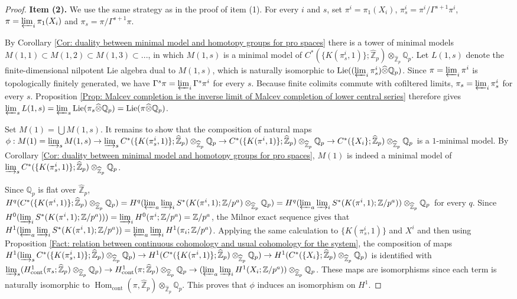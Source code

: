 \documentclass[11pt]{amsart}
\theoremstyle{definition}
\numberwithin{equation}{section}
\numberwithin{equation}{section}
\newcommand\QQ{\mathbb{Q}}
\newcommand\ZZ{\mathbb{Z}}
\DeclareMathOperator{\homo}{Hom}
\DeclareMathOperator{\Lie}{Lie}
\DeclareMathOperator{\cont}{cont}
\begin{document}
\begin{proof}
\textbf{Item (2). } We use the same strategy as in the proof of item (1). For every $i$ and $s$, set $\pi^i=\pi_1(X_i)$, $\pi^i_s=\pi^i/\Gamma^{s+1}\pi^i$, $\pi=\varprojlim_i \pi_1(X_i)$ and $\pi_s=\pi/\Gamma^{s+1}\pi$.


By Corollary \ref{Cor: duality between minimal model and homotopy groups for pro spaces} there is a tower of minimal models $M(1,1)\subset M(1,2)\subset M(1,3)\subset ...$, in which $M(1,s)$ is a minimal model of $C^*(\{K(\pi^i_s,1)\};\widehat{\ZZ}_p)\otimes_{\widehat{\ZZ}_p} \QQ_p$. Let $L(1,s)$ denote the finite-dimensional nilpotent Lie algebra dual to $M(1,s)$, which is naturally isomorphic to $\Lie((\varprojlim_i \pi^i_s)\widehat{\otimes}\QQ_p)$. Since $\pi=\varprojlim_i \pi^i$ is topologically finitely generated, we have $\Gamma^s\pi=\varprojlim_i \Gamma^s\pi^i$ for every $s$. Because finite colimits commute with cofiltered limits, $\pi_s=\varprojlim_i \pi^i_s$ for every $s$. Proposition \ref{Prop: Malcev completion is the inverse limit of Malcev completion of lower central series} therefore gives $\varprojlim_sL(1,s)=\varprojlim_s\Lie(\pi_{s}\widehat{\otimes}\QQ_p)=\Lie(\pi\widehat{\otimes}\QQ_p)$.

Set $M(1)=\bigcup M(1,s)$. It remains to show that the composition of natural maps $\phi:M(1)= \varinjlim_sM(1,s)\rightarrow \varinjlim_sC^*(\{K(\pi^i_s,1)\};\widehat{\ZZ}_p)\otimes_{\widehat{\ZZ}_p} \QQ_p\rightarrow C^*(\{K(\pi^i,1)\};\widehat{\ZZ}_p)\otimes_{\widehat{\ZZ}_p} \QQ_p\rightarrow C^*(\{X_i\};\widehat{\ZZ}_p)\otimes_{\widehat{\ZZ}_p} \QQ_p$ is a $1$-minimal model. 
By Corollary \ref{Cor: duality between minimal model and homotopy groups for pro spaces}, $M(1)$ is indeed a minimal model of $\varinjlim_sC^*(\{K(\pi^i_s,1)\};\widehat{\ZZ}_p)\otimes_{\widehat{\ZZ}_p} \QQ_p$.

Since $\QQ_p$ is flat over $\widehat{\ZZ}_p$, $H^q(C^*(\{K(\pi^i,1)\};\widehat{\ZZ}_p)\otimes_{\widehat{\ZZ}_p} \QQ_p)=H^q(\varprojlim_a \varinjlim_i S^*(K(\pi^i,1);\ZZ/p^a)\otimes_{\widehat{\ZZ}_p}\QQ_p)=H^q(\varprojlim_a \varinjlim_i S^*(K(\pi^i,1);\ZZ/p^a))\otimes_{\widehat{\ZZ}_p}\QQ_p$ for every $q$. Since $H^0(\varinjlim_i S^*(K(\pi^i,1);\ZZ/p^a)))=\varinjlim_i H^0(\pi^i;\ZZ/p^a)=\ZZ/p^a$, the Milnor exact sequence gives that $H^1(\varprojlim_a \varinjlim_i S^*(K(\pi^i,1);\ZZ/p^a))=\varprojlim_a \varinjlim_i H^1(\pi_i;\ZZ/p^a)$. Applying the same calculation to $\{K(\pi^i_s,1)\}$ and $X^i$ and then using Proposition \ref{Fact: relation between continuous cohomology and usual cohomology for the system}, the composition of maps $H^1(\varinjlim_sC^*(\{K(\pi^i_s,1)\};\widehat{\ZZ}_p)\otimes_{\widehat{\ZZ}_p} \QQ_p)\rightarrow H^1(C^*(\{K(\pi^i,1)\};\widehat{\ZZ}_p)\otimes_{\widehat{\ZZ}_p} \QQ_p)\rightarrow H^1(C^*(\{X_i\};\widehat{\ZZ}_p)\otimes_{\widehat{\ZZ}_p} \QQ_p)$ is identified with $\varinjlim_s (H^1_{\cont}(\pi_s;\widehat{\ZZ}_p)\otimes_{\widehat{\ZZ}_p}\QQ_p)\rightarrow H^1_{\cont}(\pi;\widehat{\ZZ}_p)\otimes_{\widehat{\ZZ}_p}\QQ_p\rightarrow (\varprojlim_a\varinjlim_i H^1(X_i;\ZZ/p^a))\otimes_{\widehat{\ZZ}_p}\QQ_p$. These maps are isomorphisms since each term is naturally isomorphic to $\homo_{\cont}(\pi,\widehat{\ZZ}_p)\otimes_{\widehat{\ZZ}_p}\QQ_p$. This proves that $\phi$ induces an isomorphism on $H^1$.


\end{proof}
\end{document}
